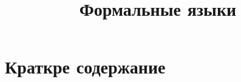\documentclass[a5paper]{article}
\title{Формальные языки}
\begin{document}
\theoremstyle{definition}
\newtheorem{mydef}{Definition}
\newtheorem{mytheorem}{Theorem}






\section{Краткре содержание}
\end{document}
